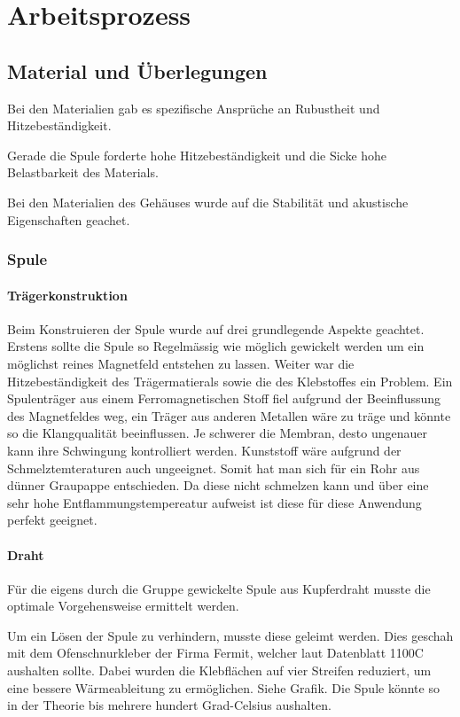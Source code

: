 \documentclass[a4paper,11pt]{report}
\begin{document}
\chapter{Arbeitsprozess}
\section{Material und Überlegungen}
Bei den Materialien gab es spezifische Ansprüche an Rubustheit und Hitzebeständigkeit.

Gerade die Spule forderte hohe Hitzebeständigkeit und die Sicke hohe Belastbarkeit des Materials.

Bei den Materialien des Gehäuses wurde auf die Stabilität und akustische Eigenschaften geachet.

\subsection{Spule}
\subsubsection*{Trägerkonstruktion}

Beim Konstruieren der Spule wurde auf drei grundlegende Aspekte geachtet. Erstens sollte die Spule so Regelmässig wie möglich gewickelt werden um ein möglichst reines Magnetfeld entstehen zu lassen. Weiter war die Hitzebeständigkeit des Trägermatierals sowie die des Klebstoffes ein Problem. Ein Spulenträger aus einem Ferromagnetischen Stoff fiel aufgrund der Beeinflussung des Magnetfeldes weg, ein Träger aus anderen Metallen wäre zu träge und könnte so die Klangqualität beeinflussen. Je schwerer die Membran, desto ungenauer kann ihre Schwingung kontrolliert werden. Kunststoff wäre aufgrund der Schmelztemteraturen auch ungeeignet. Somit hat man sich für ein Rohr aus dünner Graupappe entschieden. Da diese nicht schmelzen kann und über eine sehr hohe Entflammungstempereatur aufweist ist diese für diese Anwendung perfekt geeignet. 

\subsubsection*{Draht}
Für die eigens durch die Gruppe gewickelte Spule aus Kupferdraht musste die optimale Vorgehensweise ermittelt werden.

Um ein Lösen der Spule zu verhindern, musste diese geleimt werden. Dies geschah mit dem Ofenschnurkleber der Firma Fermit, welcher laut Datenblatt 1100\textdegree C aushalten sollte. Dabei wurden die Klebflächen auf vier Streifen reduziert, um eine bessere Wärmeableitung zu ermöglichen. Siehe Grafik. Die Spule könnte so in der Theorie bis mehrere hundert Grad-Celsius aushalten.  
\end{document}
